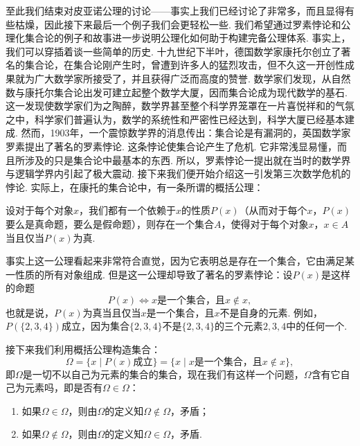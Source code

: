 至此我们结束对皮亚诺公理的讨论——事实上我们已经讨论了非常多，而且显得有些枯燥，因此接下来最后一个例子我们会更轻松一些. 我们希望通过罗素悖论和公理化集合论的例子和故事进一步说明公理化如何助于构建完备公理体系. 事实上，我们可以穿插着谈一些简单的历史. 十九世纪下半叶，德国数学家康托尔创立了著名的集合论，在集合论刚产生时，曾遭到许多人的猛烈攻击，但不久这一开创性成果就为广大数学家所接受了，并且获得广泛而高度的赞誉. 数学家们发现，从自然数与康托尔集合论出发可建立起整个数学大厦，因而集合论成为现代数学的基石.这一发现使数学家们为之陶醉，数学界甚至整个科学界笼罩在一片喜悦祥和的气氛之中，科学家们普遍认为，数学的系统性和严密性已经达到，科学大厦已经基本建成. 然而，1903年，一个震惊数学界的消息传出：集合论是有漏洞的，英国数学家罗素提出了著名的罗素悖论. 这条悖论使集合论产生了危机. 它非常浅显易懂，而且所涉及的只是集合论中最基本的东西. 所以，罗素悖论一提出就在当时的数学界与逻辑学界内引起了极大震动. 接下来我们便开始介绍这一引发第三次数学危机的悖论. 实际上，在康托的集合论中，有一条所谓的概括公理：

\begin{axiom*}
    设对于每个对象$x$，我们都有一个依赖于$x$的性质$P(x)$（从而对于每个$x$，$P(x)$要么是真命题，要么是假命题），则存在一个集合$A$，使得对于每个对象$x$，$x\in A$当且仅当$P(x)$为真.
\end{axiom*}

事实上这一公理看起来非常符合直觉，因为它表明总是存在一个集合，它由满足某一性质的所有对象组成. 但是这一公理却导致了著名的罗素悖论：设$P(x)$是这样的命题
\[P(x)\iff x\text{是一个集合，且}x\notin x,\]
也就是说，$P(x)$为真当且仅当$x$是一个集合，且$x$不是自身的元素. 例如，$P(\{2,3,4\})$成立，因为集合$\{2,3,4\}$不是$\{2,3,4\}$的三个元素$2,3,4$中的任何一个.

接下来我们利用概括公理构造集合：
\[\Omega=\{x\mid P(x)\text{成立}\}=\{x\mid x\text{是一个集合，且}x\notin x\},\]
即$\Omega$是一切不以自己为元素的集合的集合，现在我们有这样一个问题，$\Omega$含有它自己为元素吗，即是否有$\Omega\in\Omega$：
\begin{enumerate}
    \item 如果$\Omega\in \Omega$，则由$\Omega$的定义知$\Omega\notin \Omega$，矛盾；
    \item 如果$\Omega\notin \Omega$，则由$\Omega$的定义知$\Omega\in \Omega$，矛盾.
\end{enumerate}

